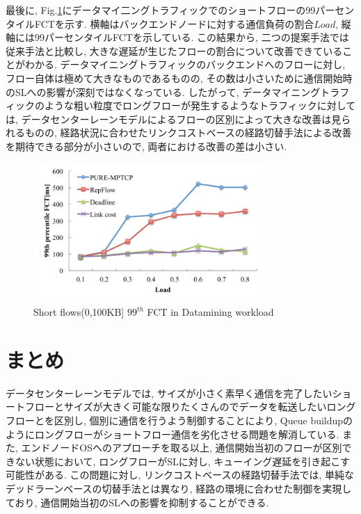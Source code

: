 最後に, 
Fig.\ref{fig:datamining_FCT_tails}にデータマイ二ングトラフィックでのショートフローの99パーセンタイルFCTを示す.
横軸はバックエンドノードに対する通信負荷の割合$Load$, 縦軸には99パーセンタイルFCTを示している. 
この結果から, 二つの提案手法では従来手法と比較し, 大きな遅延が生じたフローの割合について改善できていることがわかる. 
データマイニングトラフィックのバックエンドへのフローに対し, フロー自体は極めて大きなものであるものの,
その数は小さいために通信開始時のSLへの影響が深刻ではなくなっている. 
したがって, データマイニングトラフィックのような粗い粒度でロングフローが発生するようなトラフィックに対しては,
データセンターレーンモデルによるフローの区別によって大きな改善は見られるものの,
経路状況に合わせたリンクコストベースの経路切替手法による改善を期待できる部分が小さいので, 両者における改善の差は小さい. 
\begin{figure}[t]
    \begin{center}
    \includegraphics[autoebb, width=250pt]{./img/mining_tail.pdf}
    \caption{Short flows(0,100KB] $99^{th}$ FCT in Datamining workload}
    \label{fig:datamining_FCT_tails}
    \end{center}
\end{figure}


\section{まとめ}
データセンターレーンモデルでは,
サイズが小さく素早く通信を完了したいショートフローとサイズが大きく可能な限りたくさんのでデータを転送したいロングフローとを区別し,
個別に通信を行うよう制御することにより, Queue buildupのようにロングフローがショートフロー通信を劣化させる問題を解消している. 
また, エンドノードOSへのアプローチを取る以上, 通信開始当初のフローが区別できない状態において, ロングフローがSLに対し,
キューイング遅延を引き起こす可能性がある.
この問題に対し, リンクコストベースの経路切替手法では, 単純なデッドラーンベースの切替手法とは異なり, 経路の環境に合わせた制御を実現しており,
通信開始当初のSLへの影響を抑制することができる. 

